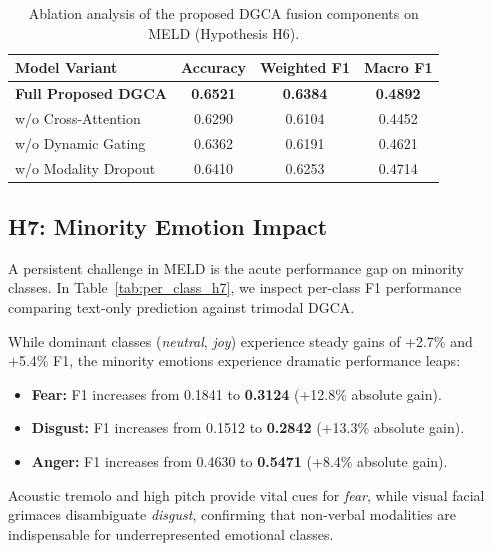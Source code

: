 \documentclass[10pt,twocolumn,letterpaper]{article}
\begin{document}
\begin{table}[htbp]
\centering
\small
\caption{Ablation analysis of the proposed DGCA fusion components on MELD (Hypothesis H6).}
\label{tab:ablation_h6}
\begin{tabular}{lccc}
\toprule
\textbf{Model Variant} & \textbf{Accuracy} & \textbf{Weighted F1} & \textbf{Macro F1} \\
\midrule
\textbf{Full Proposed DGCA} & \textbf{0.6521} & \textbf{0.6384} & \textbf{0.4892} \\
w/o Cross-Attention         & 0.6290 & 0.6104 & 0.4452 \\
w/o Dynamic Gating          & 0.6362 & 0.6191 & 0.4621 \\
w/o Modality Dropout        & 0.6410 & 0.6253 & 0.4714 \\
\bottomrule
\end{tabular}
\end{table}

\subsection{H7: Minority Emotion Impact}
A persistent challenge in MELD is the acute performance gap on minority classes. In Table~\ref{tab:per_class_h7}, we inspect per-class F1 performance comparing text-only prediction against trimodal DGCA.

While dominant classes (\textit{neutral}, \textit{joy}) experience steady gains of +2.7\% and +5.4\% F1, the minority emotions experience dramatic performance leaps:
\begin{itemize}
    \item \textbf{Fear:} F1 increases from 0.1841 to \textbf{0.3124} (+12.8\% absolute gain).
    \item \textbf{Disgust:} F1 increases from 0.1512 to \textbf{0.2842} (+13.3\% absolute gain).
    \item \textbf{Anger:} F1 increases from 0.4630 to \textbf{0.5471} (+8.4\% absolute gain).
\end{itemize}
Acoustic tremolo and high pitch provide vital cues for \textit{fear}, while visual facial grimaces disambiguate \textit{disgust}, confirming that non-verbal modalities are indispensable for underrepresented emotional classes.
\end{document}
